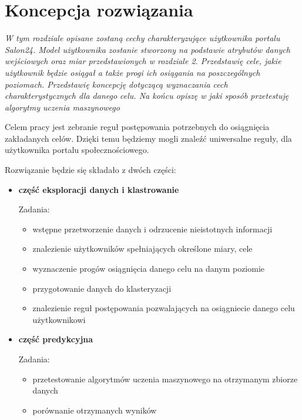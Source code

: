 \documentclass[polish,12pt]{aghthesis}
\begin{document}
\newpage
\section{Koncepcja rozwiązania}
\emph{W tym rozdziale opisane zostaną cechy charakteryzujące użytkownika portalu Salon24. Model użytkownika zostanie stworzony na podstawie atrybutów danych wejściowych oraz miar przedstawionych w rozdziale 2. Przedstawię cele, jakie użytkownik będzie osiągał a także progi ich osiągania na poszczególnych poziomach. Przedstawię koncepcję dotyczącą wyznaczania cech charakterystycznych dla danego celu. Na końcu opiszę w jaki sposób przetestuję algorytmy uczenia maszynowego}

\vspace{5mm}
Celem pracy jest zebranie reguł postępowania potrzebnych do osiągnięcia zakładanych celów. Dzięki temu będziemy mogli znaleźć uniwersalne reguły, dla użytkownika portalu społecznościowego. 

Rozwiązanie będzie się składało z dwóch części:
\begin{itemize}
    \item \textbf{część eksploracji danych i klastrowanie}
    
    Zadania:
    \begin{itemize}
        \item wstępne przetworzenie danych i odrzucenie nieistotnych informacji
        \item znalezienie użytkowników spełniających określone miary, cele
        \item wyznaczenie progów osiągnięcia danego celu na danym poziomie
        \item przygotowanie danych do klasteryzacji
        \item znalezienie reguł postępowania pozwalających na osiągniecie danego celu użytkownikowi
    \end{itemize}
    \item \textbf{część predykcyjna}
    
    Zadania:
    \begin{itemize}
        \item przetestowanie algorytmów uczenia maszynowego na otrzymanym zbiorze danych
        \item porównanie otrzymanych wyników
        
    \end{itemize}
\end{itemize}
\end{document}
